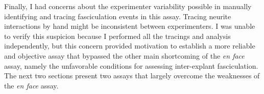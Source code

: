 Finally, I had concerns about the experimenter variability possible in manually identifying and tracing fasciculation events in this assay.
Tracing neurite interactions by hand might be inconsistent between experimenters.
I was unable to verify this suspicion because I performed all the tracings and analysis independently, but this concern provided motivation to establish a more reliable and objective assay that bypassed the other main shortcoming of the \emph{en face} assay, namely the unfavorable conditions for assessing inter-explant fasciculation.
The next two sections present two assays that largely overcome the weaknesses of the \emph{en face} assay.
